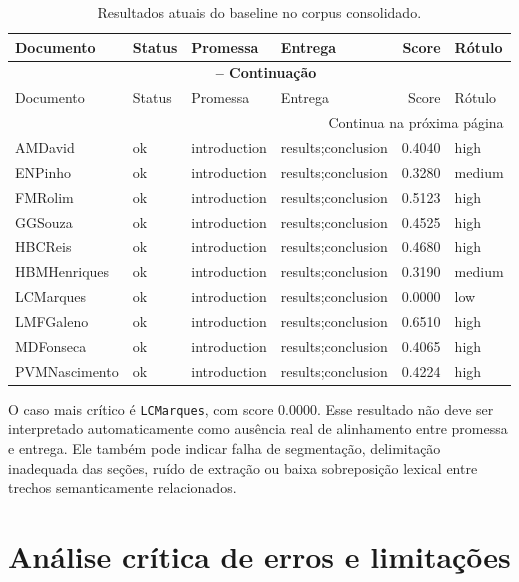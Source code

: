 \documentclass[12pt]{article}
\begin{document}
\begin{longtable}{llllrl}
    \caption{Resultados atuais do baseline no corpus consolidado.} \label{tab:resultados_intermediarios} \\
    \toprule
    Documento & Status & Promessa & Entrega & Score & Rótulo \\
    \midrule
    \endfirsthead

    \multicolumn{6}{c}{{\bfseries \tablename\ \thetable{} -- Continuação}} \\
    \toprule
    Documento & Status & Promessa & Entrega & Score & Rótulo \\
    \midrule
    \endhead

    \midrule
    \multicolumn{6}{r}{{Continua na próxima página}} \\
    \bottomrule
    \endfoot

    \bottomrule
    \endlastfoot

    AMDavid & ok & introduction & results;conclusion & 0.4040 & high \\
    ENPinho & ok & introduction & results;conclusion & 0.3280 & medium \\
    FMRolim & ok & introduction & results;conclusion & 0.5123 & high \\
    GGSouza & ok & introduction & results;conclusion & 0.4525 & high \\
    HBCReis & ok & introduction & results;conclusion & 0.4680 & high \\
    HBMHenriques & ok & introduction & results;conclusion & 0.3190 & medium \\
    LCMarques & ok & introduction & results;conclusion & 0.0000 & low \\
    LMFGaleno & ok & introduction & results;conclusion & 0.6510 & high \\
    MDFonseca & ok & introduction & results;conclusion & 0.4065 & high \\
    PVMNascimento & ok & introduction & results;conclusion & 0.4224 & high \\
\end{longtable}

O caso mais crítico é \texttt{LCMarques}, com score 0.0000. Esse resultado não deve ser interpretado automaticamente como ausência real de alinhamento entre promessa e entrega. Ele também pode indicar falha de segmentação, delimitação inadequada das seções, ruído de extração ou baixa sobreposição lexical entre trechos semanticamente relacionados.

\section{Análise crítica de erros e limitações}
\end{document}
